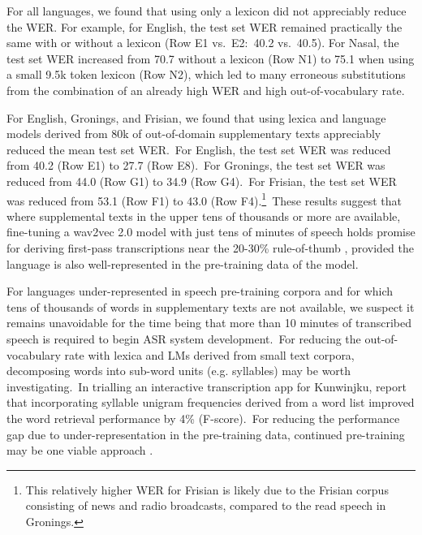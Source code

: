 \documentclass[main.tex]{subfiles}
\begin{document}
For all languages, we found that using only a lexicon did not appreciably reduce the WER.
For example, for English, the test set WER remained practically the same with or without a lexicon (Row E1 vs.~E2:~40.2 vs.~40.5). For Nasal, the test set WER increased from 70.7 without a lexicon (Row N1) to 75.1 when using a small 9.5k token lexicon (Row N2), which led to many erroneous substitutions from the combination of an already high WER and high out-of-vocabulary rate.

For English, Gronings, and Frisian, we found that using lexica and language models derived from 80k of out-of-domain supplementary texts appreciably reduced the mean test set WER.~For English, the test set WER was reduced from 40.2 (Row E1) to 27.7 (Row E8).~For Gronings, the test set WER was reduced from 44.0 (Row G1) to 34.9 (Row G4).~For Frisian, the test set WER was reduced from 53.1 (Row F1) to 43.0 (Row F4).\footnote{This relatively higher WER for Frisian is likely due to the Frisian corpus consisting of news and radio broadcasts, compared to the read speech in Gronings.}~These results suggest that where supplemental texts in the upper tens of thousands or more are available, fine-tuning a wav2vec 2.0 model with just tens of minutes of speech holds promise for deriving first-pass transcriptions near the 20-30\% rule-of-thumb \parencite{gaur2016effects,sperber-etal-2016-optimizing}, provided the language is also well-represented in the pre-training data of the model.

For languages under-represented in speech pre-training corpora and for which tens of thousands of words in supplementary texts are not available, we suspect it remains unavoidable for the time being that more than 10 minutes of transcribed speech is required to begin ASR system development.~For reducing the out-of-vocabulary rate with lexica and LMs derived from small text corpora, decomposing words into sub-word units (e.g. syllables) may be worth investigating.~In trialling an interactive transcription app for Kunwinjku, \textcite{le-ferrand-etal-2022-fashioning} report that incorporating syllable unigram frequencies derived from a word list improved the word retrieval performance by 4\% (F-score).~For reducing the performance gap due to under-representation in the pre-training data, continued pre-training may be one viable approach \parencite[e.g.][]{NOWAKOWSKI2023103148}.

\end{document}
